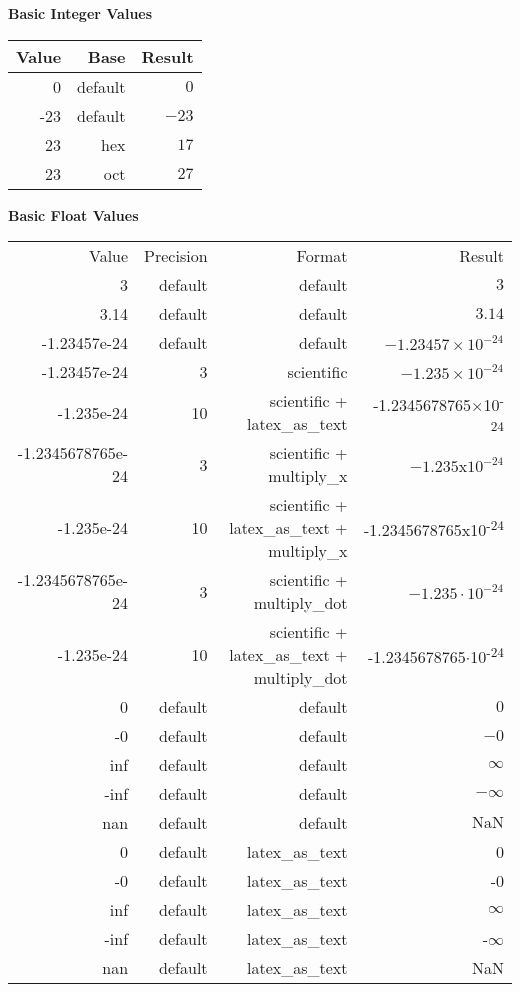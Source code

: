 \documentclass[10pt]{article}
\begin{document}
\textbf{Basic Integer Values}

\begin{tabular}{r r r}
Value & Base & Result \\ \hline 
0 & default & $0$\\
-23 & default & $-23$ \\
23 & hex & $17$\\
23 & oct & $27$\\
\end{tabular}

\textbf{Basic Float Values}

\begin{tabular}{r r r r}
Value & Precision & Format & Result \\
3 & default & default & $3$ \\
3.14 & default & default & $3.14$ \\
-1.23457e-24 & default & default & $-1.23457\times10^{-24}$ \\
-1.23457e-24 & 3 & scientific & $-1.235\times10^{-24}$ \\
-1.235e-24 & 10 & scientific + latex\_as\_text & -1.2345678765$\times$10\textsuperscript{-24} \\
-1.2345678765e-24 & 3 & scientific + multiply\_x & $-1.235\mathrm{x}10^{-24}$ \\
-1.235e-24 & 10 & scientific + latex\_as\_text + multiply\_x & -1.2345678765x10\textsuperscript{-24} \\
-1.2345678765e-24 & 3 & scientific + multiply\_dot & $-1.235\cdot10^{-24}$ \\
-1.235e-24 & 10 & scientific + latex\_as\_text + multiply\_dot & -1.2345678765$\cdot$10\textsuperscript{-24} \\
0 & default & default & $0$ \\
-0 & default & default & $-0$ \\
inf & default & default & $\infty$ \\
-inf & default & default & $-\infty$ \\
nan & default & default & $\mathrm{NaN}$ \\
0 & default & latex\_as\_text & 0 \\
-0 & default & latex\_as\_text & -0 \\
inf & default & latex\_as\_text & $\infty$ \\
-inf & default & latex\_as\_text & -$\infty$ \\
nan & default & latex\_as\_text & NaN \\
\end{tabular}
\end{document}
